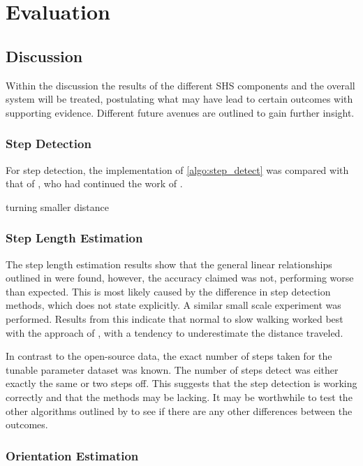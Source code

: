 \chapter{Evaluation}

\section{Discussion}
Within the discussion the results of the different \ac{SHS} components and the overall system will be treated, postulating what may have lead to certain outcomes with supporting evidence. Different future avenues are outlined to gain further insight.

\subsection*{Step Detection}
For step detection, the implementation of \cref{algo:step_detect} was compared with that of \citet{Salvi2018}, who had continued the work of \cite{Harle2013}.  \par 


turning smaller distance \cite{Sun2015}

\subsection*{Step Length Estimation}
The step length estimation results show that the general linear relationships outlined in \cite{Vezocnik2019} were found, however, the accuracy claimed was not, performing worse than expected. This is most likely caused by the difference in step detection methods, which \cite{Vezocnik2019} does not state explicitly. A similar small scale experiment was performed. Results from this indicate that normal to slow walking worked best with the approach of \citet{Tian2016}, with a tendency to underestimate the distance traveled. \par 

In contrast to the open-source data, the exact number of steps taken for the tunable parameter dataset was known. The number of steps detect was either exactly the same or two steps off. This suggests that the step detection is working correctly and that the methods may be lacking. It may be worthwhile to test the other algorithms outlined by \cite{Vezocnik2019} to see if there are any other differences between the outcomes. 

\newpage


\subsection*{Orientation Estimation}

